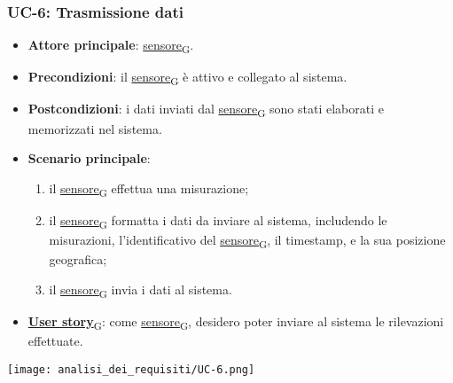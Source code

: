 \subsubsection{UC-6: Trasmissione dati}
\begin{itemize}
	\item \textbf{Attore principale}: \href{https://7last.github.io/docs/pb/documentazione-interna/glossario\#sensore}{sensore\textsubscript{G}}.
	\item \textbf{Precondizioni}: il \href{https://7last.github.io/docs/pb/documentazione-interna/glossario\#sensore}{sensore\textsubscript{G}} è attivo e collegato al sistema.
	\item \textbf{Postcondizioni}: i dati inviati dal \href{https://7last.github.io/docs/pb/documentazione-interna/glossario\#sensore}{sensore\textsubscript{G}} sono stati elaborati e memorizzati nel sistema.
	\item \textbf{Scenario principale}:
	      \begin{enumerate}
		      \item il \href{https://7last.github.io/docs/pb/documentazione-interna/glossario\#sensore}{sensore\textsubscript{G}} effettua una misurazione;
		      \item il \href{https://7last.github.io/docs/pb/documentazione-interna/glossario\#sensore}{sensore\textsubscript{G}} formatta i dati da inviare al sistema, includendo le misurazioni, l'identificativo del \href{https://7last.github.io/docs/pb/documentazione-interna/glossario\#sensore}{sensore\textsubscript{G}}, il timestamp, e la sua posizione geografica;
		      \item il \href{https://7last.github.io/docs/pb/documentazione-interna/glossario\#sensore}{sensore\textsubscript{G}} invia i dati al sistema.
	      \end{enumerate}
	\item \href{https://7last.github.io/docs/pb/documentazione-interna/glossario\#user-story}{\textbf{User story}\textsubscript{G}}: come \href{https://7last.github.io/docs/pb/documentazione-interna/glossario\#sensore}{sensore\textsubscript{G}}, desidero poter inviare al sistema le rilevazioni effettuate.
\end{itemize}

\begin{center}
	\texttt{[image: analisi\_dei\_requisiti/UC-6.png]}
\end{center}

